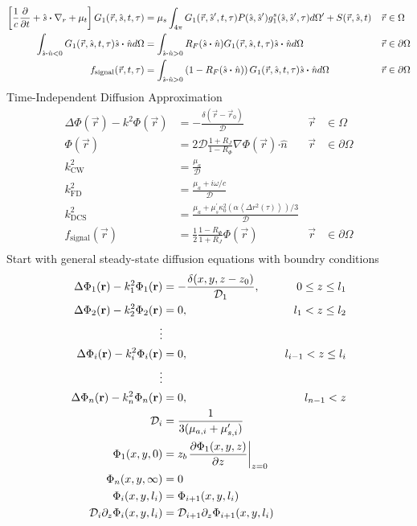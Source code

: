 \documentclass{article}
\newcommand{\diffusion}{\mathcal{D}}
\newcommand{\vdot}{\boldsymbol{\cdot}}
\newcommand{\va}[1]{\vec{\mathit{#1}}}
\newcommand{\vu}[1]{\hat{\mathit{#1}}}
\newcommand{\at}[2]{{\left.{#1}\right|_{#2}}}
\begin{document}
\begin{align*}
    \left[\frac{1}{c}\diffp{}{t} + \vu{s}\vdot \nabla_{r} + \mu_t\right] G_1(\va{r}, \vu{s}, t, \tau) &=
    \mu_s \int_{4 \pi} G_1(\va{r}, \vu{s}^{\prime}, t, \tau) P(\vu{s}, \vu{s}^{\prime}) g_1^s(\vu{s}, \vu{s}^{\prime}, \tau) d\Omega^{\prime} + S(\va{r}, \vu{s}, t)  &\va{r} &\in \Omega \\
    \int_{\vu{s}\vdot\vu{n}<0} G_1(\va{r}, \vu{s}, t, \tau) \vu{s}\vdot\vu{n} d\Omega &=
    \int_{\vu{s}\vdot\vu{n}>0} R_F(\vu{s}\vdot\vu{n}) G_1(\va{r}, \vu{s}, t, \tau) \vu{s}\vdot\vu{n} d\Omega &\va{r} &\in \partial\Omega \\
    f_{\text{signal}}(\va{r}, t, \tau) &= \int_{\vu{s}\vdot\vu{n}>0} \left(1 - R_F(\vu{s}\vdot\vu{n})\right) G_1(\va{r}, \vu{s}, t, \tau) \vu{s}\vdot\vu{n} d\Omega &\va{r} &\in \partial\Omega \\
\end{align*}
Time-Independent Diffusion Approximation
\begin{align*}
    \Delta \Phi(\va{r}) - k^2\Phi(\va{r}) &= -\frac{\delta(\va{r} - \va{r}_0)}{\diffusion} &\va{r} &\in \Omega \\
    \Phi(\va{r}) &= 2 \diffusion \frac{1 + R_J}{1 - R_{\Phi}} \nabla\Phi(\va{r}) \vdot \vu{n} &\va{r} &\in \partial\Omega \\
    k^2_{\text{CW}} &= \frac{\mu_a}{\diffusion} \\
    k^2_{\text{FD}} &= \frac{\mu_a + i \omega / c}{\diffusion} \\
    k^2_{\text{DCS}} &= \frac{\mu_a + \mu_s^{\prime} \kappa_0^2 \left(\alpha \left\langle \Delta r^2 (\tau) \right\rangle\right)/3 }{\diffusion} \\
    f_{\text{signal}}(\va{r}) &= \frac{1}{2} \frac{1 - R_{\Phi}}{1 + R_J} \Phi(\va{r}) &\va{r} &\in \partial\Omega \\
\end{align*}
Start with general steady-state diffusion equations with boundry conditions
\begin{align*}
    \Delta \Phi_1(\mathbf{r}) - k_1^2 \Phi_1(\mathbf{r}) &= -\frac{\delta(x, y, z - z_0)}{\diffusion_1}, & 0 \le z \le l_1 \\
    \Delta \Phi_2(\mathbf{r}) - k_2^2 \Phi_2(\mathbf{r}) &= 0, & l_1 < z \le l_2 \\
    \vdots \\
    \Delta \Phi_i(\mathbf{r}) - k_i^2 \Phi_i(\mathbf{r}) &= 0, & l_{i-1} < z \le l_i \\
    \vdots \\
    \Delta \Phi_n(\mathbf{r}) - k_n^2 \Phi_n(\mathbf{r}) &= 0, & l_{n-1} < z \\
    \diffusion_i &= \frac{1}{3(\mu_{a,i} + \mu^{\prime}_{s,i})} \\
    \Phi_1(x, y, 0) &= z_b \at{\diffp{\Phi_1(x, y, z)}{z}}{z=0} \\
    \Phi_n(x, y, \infty) &= 0 \\
    \Phi_i(x, y, l_i) &= \Phi_{i+1}(x, y, l_i) \\
    \diffusion_i \partial_z \Phi_i(x, y, l_i) &= \diffusion_{i+1} \partial_z \Phi_{i+1}(x, y, l_i) \\
\end{align*}
\end{document}
